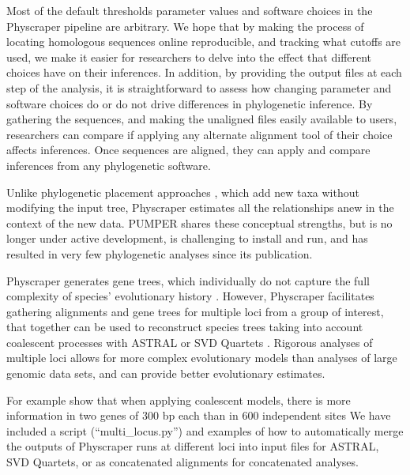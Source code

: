 \documentclass{bmcart}
\begin{document}
Most of the default thresholds parameter values and software choices in the Physcraper pipeline are arbitrary.
We hope that by making the process of locating homologous sequences online reproducible,
and tracking what cutoffs are used, we make it easier for researchers to delve into the effect that different choices have on their inferences.
In addition, by providing the output files at each step of the analysis,
it is straightforward to assess how changing parameter and software choices do or do not drive differences in phylogenetic inference.
By gathering the sequences, and making the unaligned files easily available to users, researchers can compare if applying any alternate alignment tool of their choice affects inferences.
Once sequences are aligned, they can apply and compare inferences from any phylogenetic software.

Unlike phylogenetic placement approaches \cite{berger_performance_2011, matsen_pplacer_2010},
which add new taxa without modifying the input tree, Physcraper estimates all
the relationships anew in the context of the new data.
PUMPER \cite{izquierdo2014pumper} shares these conceptual strengths, but is no
longer under active development, is challenging to install and run, and has resulted
in very few phylogenetic analyses since its publication.

Physcraper generates gene trees, which individually do not capture the full complexity
of species' evolutionary history \cite{song2012resolving}.
However, Physcraper facilitates
gathering alignments and gene trees for multiple loci from a group of interest,
that together can be used to reconstruct species trees taking into account coalescent
processes with ASTRAL \cite{mirarab2014astral} or SVD Quartets \cite{chifman2014quartet}.
Rigorous analyses of multiple loci allows for more complex evolutionary models
than analyses of large genomic data sets, and can provide better evolutionary estimates.

For example \cite{zhu_complexity_2021} show that when applying coalescent models, there is more information in two genes of 300 bp each than in 600 independent sites
We have included a script (``multi\_locus.py'') and examples of how to automatically merge the outputs of Physcraper runs at different loci into input files for ASTRAL, SVD Quartets, or as concatenated alignments for concatenated analyses.
\end{document}

